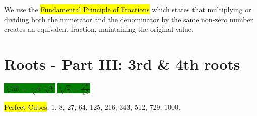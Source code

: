 We use the \hl{Fundamental Principle of Fractions} which states that multiplying or dividing both the numerator and the denominator by the same non-zero number creates an equivalent fraction, maintaining the original value.

\section{Roots - Part III: 3rd \& 4th roots}

\begin{tcolorbox}[
  enhanced,attach boxed title to top center={yshift=-3mm,yshifttext=-1mm},
  colback=blue!5!white,colframe=blue!75!black,colbacktitle=red!80!black,
  title=nth Root Rules,fonttitle=\bfseries,
  boxed title style={size=small,colframe=red!50!black}
]
  \hspace{2cm}
  \colorbox{green}{$\sqrt[n]{ab}=\sqrt[n]{a}\sqrt[n]{b}$}
  \hspace{6cm}
  \colorbox{green}{$\sqrt[n]{\frac{a}{b}}=\frac{\sqrt[n]{a}}{\sqrt[n]{b}}$}
\end{tcolorbox}

\hl{Perfect Cubes}: 1, 8, 27, 64, 125, 216, 343, 512, 729, 1000.

\vspace{.5cm}

